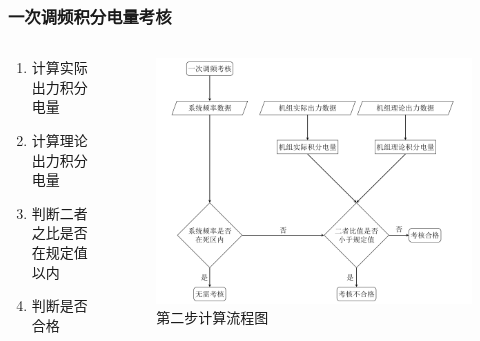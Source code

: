 \documentclass[aspectratio=43, 10pt, utf8, mathserif]{beamer}
\begin{document}
	\begin{frame}
	\frametitle{一次调频积分电量考核}
	
	\begin{columns}
		\begin{column}{.4\linewidth}
			\begin{enumerate}
				\item 计算实际出力积分电量
				\item 计算理论出力积分电量
				\item 判断二者之比是否在规定值以内
				\item 判断是否合格
			\end{enumerate}
		\end{column}
		
		\begin{column}{.6\linewidth}
		\begin{figure}[H]
			\centering
			\includegraphics[width=1.03\linewidth]{pic/screenshot031}
			\caption{第二步计算流程图}
			\label{fig:screenshot031}
		\end{figure}
			
		\end{column}
	\end{columns}
\end{frame}
\end{document}
